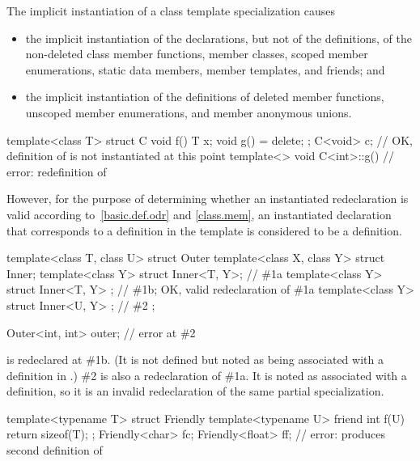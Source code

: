 \pnum
The implicit instantiation of a class template specialization causes
\begin{itemize}
\item
  the implicit instantiation of the declarations, but not of the definitions,
  of the non-deleted
  class member functions,
  member classes,
  scoped member enumerations,
  static data members,
  member templates, and
  friends; and
\item
  the implicit instantiation of the definitions of
  deleted member functions,
  unscoped member enumerations, and
  member anonymous unions.
\end{itemize}
\begin{example}
\begin{codeblock}
template<class T>
struct C {
  void f() { T x; }
  void g() = delete;
};
C<void> c;                      // OK, definition of  is not instantiated at this point
template<> void C<int>::g() { } // error: redefinition of 
\end{codeblock}
\end{example}
However, for the purpose of determining whether an instantiated redeclaration
is valid according to~\ref{basic.def.odr} and \ref{class.mem},
an instantiated declaration that corresponds to a definition in the template
is considered to be a definition.
\begin{example}
\begin{codeblock}
template<class T, class U>
struct Outer {
  template<class X, class Y> struct Inner;
  template<class Y> struct Inner<T, Y>;         // \#1a
  template<class Y> struct Inner<T, Y> { };     // \#1b; OK, valid redeclaration of \#1a
  template<class Y> struct Inner<U, Y> { };     // \#2
};

Outer<int, int> outer;                          // error at \#2
\end{codeblock}

 is redeclared at \#1b. (It is not defined
but noted as being associated with a definition in .) \#2
is also a redeclaration of \#1a. It is noted as associated with a definition,
so it is an invalid redeclaration of the same partial specialization.

\begin{codeblock}
template<typename T> struct Friendly {
  template<typename U> friend int f(U) { return sizeof(T); }
};
Friendly<char> fc;
Friendly<float> ff;                             // error: produces second definition of 
\end{codeblock}
\end{example}

